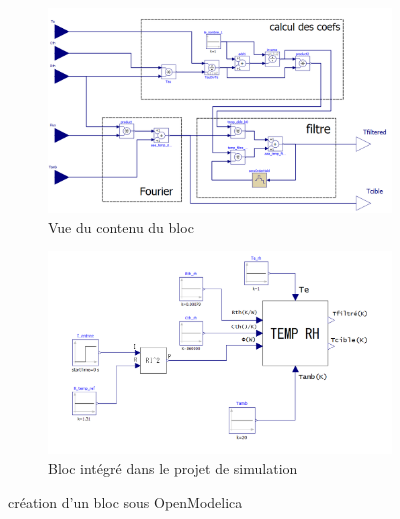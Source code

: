 \documentclass[a4paper]{report}
\begin{document}
	
	\begin{figure}[h]
		
		\begin{subfigure}{0.5\textwidth}
			\includegraphics[width=0.9\linewidth]{rh_fourier} 
			\caption{Vue du contenu du bloc}
			\label{fig:subim1}
		\end{subfigure}
		\begin{subfigure}{0.5\textwidth}
			\includegraphics[width=0.9\linewidth]{rh_modelica}
			\caption{Bloc intégré dans le projet de simulation}
			\label{fig:subim2}
		\end{subfigure}
		
		\caption{création d'un bloc sous OpenModelica}
		\label{fig:image2}
	\end{figure}
\end{document}
